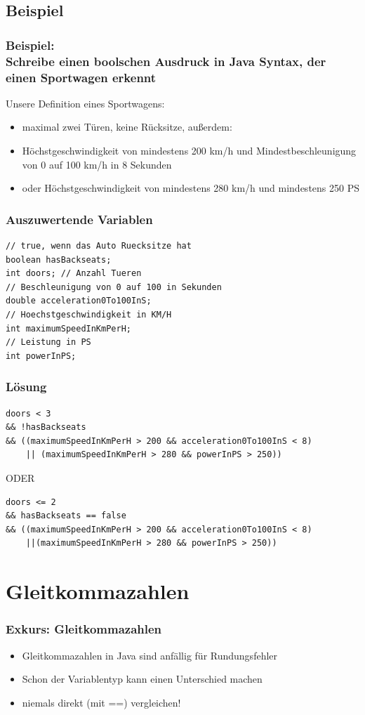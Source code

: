 \documentclass[final]{beamer}
\begin{document}
\subsection{Beispiel}
\begin{frame}
	\frametitle{Beispiel: \\Schreibe einen boolschen Ausdruck in Java Syntax, der einen Sportwagen erkennt}
	Unsere Definition eines Sportwagens:	\\
	\begin{itemize}
		\item{maximal zwei Türen, keine Rücksitze, außerdem:}
		\item{Höchstgeschwindigkeit von mindestens 200 km/h und  Mindestbeschleunigung von 0 auf 100 km/h in 8 Sekunden}
		\item{oder Höchstgeschwindigkeit von mindestens 280 km/h und mindestens 250 PS}
	\end{itemize}
\end{frame}

\begin{frame}[containsverbatim]
	\frametitle{Auszuwertende Variablen}
	\begin{lstlisting}
// true, wenn das Auto Ruecksitze hat
boolean hasBackseats;
int doors; // Anzahl Tueren
// Beschleunigung von 0 auf 100 in Sekunden
double acceleration0To100InS;
// Hoechstgeschwindigkeit in KM/H
int maximumSpeedInKmPerH;
// Leistung in PS
int powerInPS;
	\end{lstlisting}
\end{frame}

\begin{frame}[containsverbatim]
	\frametitle{Lösung}
\begin{lstlisting}
doors < 3
&& !hasBackseats
&& ((maximumSpeedInKmPerH > 200 && acceleration0To100InS < 8)
	|| (maximumSpeedInKmPerH > 280 && powerInPS > 250))
\end{lstlisting}
\vfill
ODER
\vfill
\begin{lstlisting}
doors <= 2
&& hasBackseats == false
&& ((maximumSpeedInKmPerH > 200 && acceleration0To100InS < 8)
	||(maximumSpeedInKmPerH > 280 && powerInPS > 250))
\end{lstlisting}

\end{frame}

\section{Gleitkommazahlen}
\begin{frame}
	\frametitle{Exkurs: Gleitkommazahlen}
	\begin{itemize}
		\item{Gleitkommazahlen in Java sind anfällig für Rundungsfehler}
		\item{Schon der Variablentyp kann einen Unterschied machen}
		\item{niemals direkt (mit ==) vergleichen!}
	\end{itemize}
\end{frame}
\end{document}
